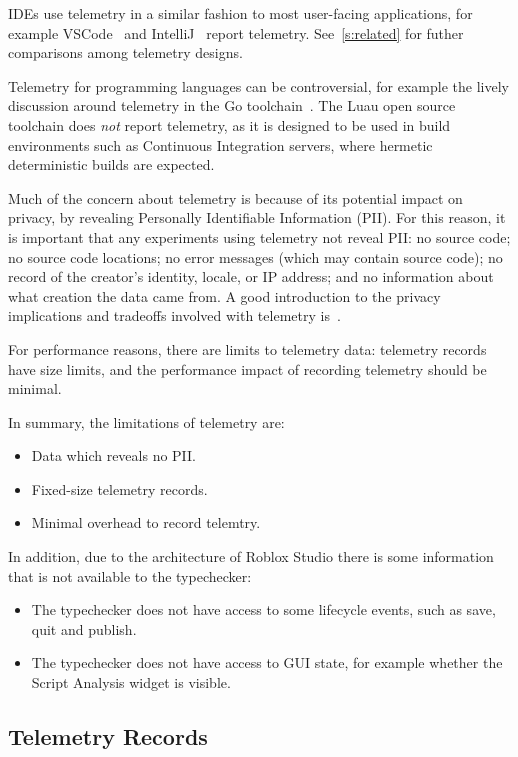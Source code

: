 \documentclass[english,submission,cleveref]{programming}
\begin{document}
IDEs use telemetry in a similar fashion to most user-facing
applications, for example VSCode~\cite{vsc-telemetry} and
IntelliJ~\cite{intellij-telemetry} report telemetry.
See~\cref{s:related} for futher comparisons among telemetry designs.

Telemetry for programming languages can be controversial, for example
the lively discussion around telemetry in the Go
toolchain~\cite{golang-telemetry}. 
The Luau open source toolchain does \emph{not} report telemetry,
as it is designed to be used in build environments such as Continuous Integration
servers, where hermetic deterministic builds are expected.

Much of the concern about telemetry is because of its potential impact on
privacy, by revealing Personally Identifiable Information (PII).
For this reason, it is important that any experiments using telemetry
not reveal PII:
no source code;
no source code locations;
no error messages (which may contain source code);
no record of the creator's identity, locale, or IP address;
and no information about what creation the data came from.
A good introduction to the privacy implications and tradeoffs
involved with telemetry is~\cite{transparent-telemetry}.

For performance reasons, there are limits to telemetry data:
telemetry records have size limits, and the performance impact of
recording telemetry should be minimal.

In summary, the limitations of telemetry are:
\begin{itemize}
  \item Data which reveals no PII.
  \item Fixed-size telemetry records.
  \item Minimal overhead to record telemtry.
\end{itemize}
In addition, due to the architecture of Roblox Studio
there is some information that is not available to the
typechecker:
\begin{itemize}
  \item The typechecker does not have access to some lifecycle events,
    such as save, quit and publish.
  \item The typechecker does not have access to GUI state, for example
    whether the Script Analysis widget is visible.
\end{itemize}

\subsection{Telemetry Records}
\label{s:telemetry-records}
\end{document}
